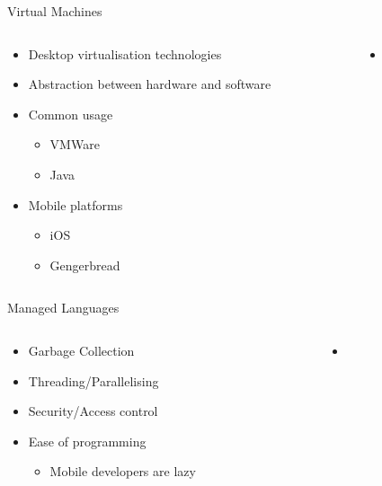 \documentclass{beamer}
\begin{document}
\begin{frame}{Virtual Machines}
\begin{columns}
\begin{column}{5cm}
\begin{itemize}
	\item Desktop virtualisation technologies
	\item Abstraction between hardware and software
	\item Common usage
	\begin{itemize}
		\item VMWare
		\item Java
	\end{itemize}
	\item Mobile platforms
	\begin{itemize}
		\item iOS
		\item Gengerbread
	\end{itemize}
\end{itemize}
\end{column}
\begin{column}{5cm}
\begin{itemize}
	\begin{itemize}
		\item {}
	\end{itemize}
\end{itemize}
\end{column}
\end{columns}
\end{frame}

\begin{frame}{Managed Languages}
\begin{columns}
\begin{column}{5cm}
\begin{itemize}
	\item Garbage Collection
	\item Threading/Parallelising
	\item Security/Access control
	\item Ease of programming
	\begin{itemize}
		\item Mobile developers are lazy
	\end{itemize}
\end{itemize}
\end{column}
\begin{column}{5cm}
\begin{itemize}
	\begin{itemize}
		\item {}
	\end{itemize}
\end{itemize}
\end{column}
\end{columns}
\end{frame}
\end{document}
